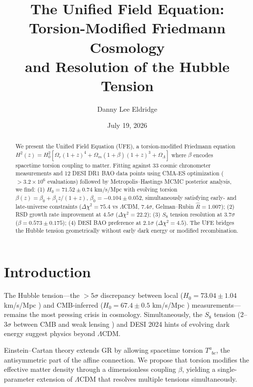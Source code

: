 \documentclass[twocolumn,prd,superscriptaddress,nofootinbib]{revtex4-2}
\begin{document}
\title{The Unified Field Equation: Torsion-Modified Friedmann Cosmology\\
and Resolution of the Hubble Tension}

\author{Danny Lee Eldridge}

\date{July 19, 2026}

\begin{abstract}
We present the Unified Field Equation (UFE), a torsion-modified Friedmann equation
$H^2(z) = H_0^2[\Omega_r(1+z)^4 + \Omega_m(1+\beta)(1+z)^3 + \Omega_\Lambda]$
where $\beta$ encodes spacetime torsion coupling to matter. Fitting against 33 cosmic chronometer measurements and 12 DESI DR1 BAO data points using CMA-ES optimization ($>3.2\times10^6$ evaluations) followed by Metropolis--Hastings MCMC posterior analysis, we find: (1) $H_0 = 71.52 \pm 0.74$ km/s/Mpc with evolving torsion $\beta(z) = \beta_0 + \beta_1 z/(1+z)$, $\beta_0 = -0.104 \pm 0.052$, simultaneously satisfying early- and late-universe constraints ($\Delta\chi^2 = 75.4$ vs $\Lambda$CDM, $7.4\sigma$, Gelman--Rubin $\hat{R} = 1.007$); (2) RSD growth rate improvement at $4.5\sigma$ ($\Delta\chi^2 = 22.2$); (3) $S_8$ tension resolution at $3.7\sigma$ ($\beta = 0.573 \pm 0.175$); (4) DESI BAO preference at $2.1\sigma$ ($\Delta\chi^2 = 4.5$). The UFE bridges the Hubble tension geometrically without early dark energy or modified recombination.
\end{abstract}

\maketitle

\section{Introduction}
\label{sec:intro}

The Hubble tension---the $>5\sigma$ discrepancy between local ($H_0 = 73.04 \pm 1.04$ km/s/Mpc \cite{Riess2022}) and CMB-inferred ($H_0 = 67.4 \pm 0.5$ km/s/Mpc \cite{Planck2020}) measurements---remains the most pressing crisis in cosmology. Simultaneously, the $S_8$ tension ($2$--$3\sigma$ between CMB and weak lensing \cite{KiDS2021,DESY3}) and DESI 2024 hints of evolving dark energy \cite{DESI2024} suggest physics beyond $\Lambda$CDM.

Einstein--Cartan theory \cite{Hehl1976,Cartan1922} extends GR by allowing spacetime torsion $T^a_{\phantom{a}bc}$, the antisymmetric part of the affine connection. We propose that torsion modifies the effective matter density through a dimensionless coupling $\beta$, yielding a single-parameter extension of $\Lambda$CDM that resolves multiple tensions simultaneously.
\end{document}

